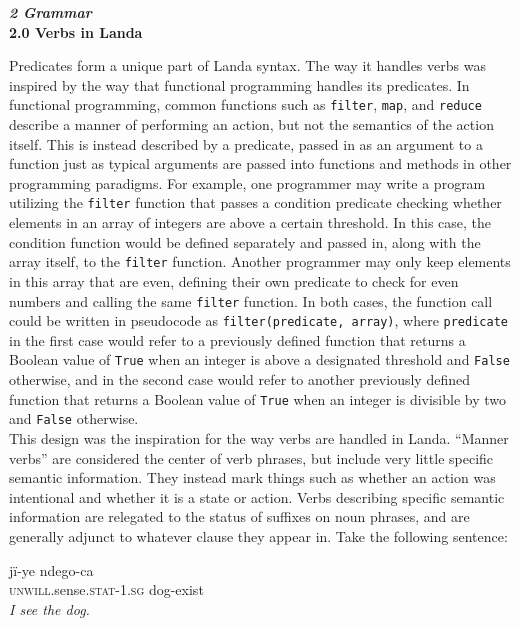 \documentclass{article}[10pt]
\begin{document}
\clearpage
{\bf \emph{2 Grammar}}\\

{\bf 2.0 Verbs in Landa}

Predicates form a unique part of Landa syntax. The way it handles verbs was inspired by the way that functional programming handles its predicates. In functional programming, common functions such as \texttt{filter}, \texttt{map}, and \texttt{reduce} describe a manner of performing an action, but not the semantics of the action itself. This is instead described by a predicate, passed in as an argument to a function just as typical arguments are passed into functions and methods in other programming paradigms. For example, one programmer may write a program utilizing the \texttt{filter} function that passes a condition predicate checking whether elements in an array of integers are above a certain threshold. In this case, the condition function would be defined separately and passed in, along with the array itself, to the \texttt{filter} function. Another programmer may only keep elements in this array that are even, defining their own predicate to check for even numbers and calling the same \texttt{filter} function. In both cases, the function call could be written in pseudocode as \texttt{filter(predicate, array)}, where \texttt{predicate} in the first case would refer to a previously defined function that returns a Boolean value of \texttt{True} when an integer is above a designated threshold and \texttt{False} otherwise, and in the second case would refer to another previously defined function that returns a Boolean value of \texttt{True} when an integer is divisible by two and \texttt{False} otherwise.\\

This design was the inspiration for the way verbs are handled in Landa. ``Manner verbs'' are considered the center of verb phrases, but include very little specific semantic information. They instead mark things such as whether an action was intentional and whether it is a state or action. Verbs describing specific semantic information are relegated to the status of suffixes on noun phrases, and are generally adjunct to whatever clause they appear in. Take the following sentence:

\begin{exe}
\ex 
\gll j\"{i}-ye ndego-ca\\
\textsc{unwill}.sense.\textsc{stat}-1.\textsc{sg} dog-exist\\
\trans \emph{I see the dog.}
\end{exe}
\end{document}
